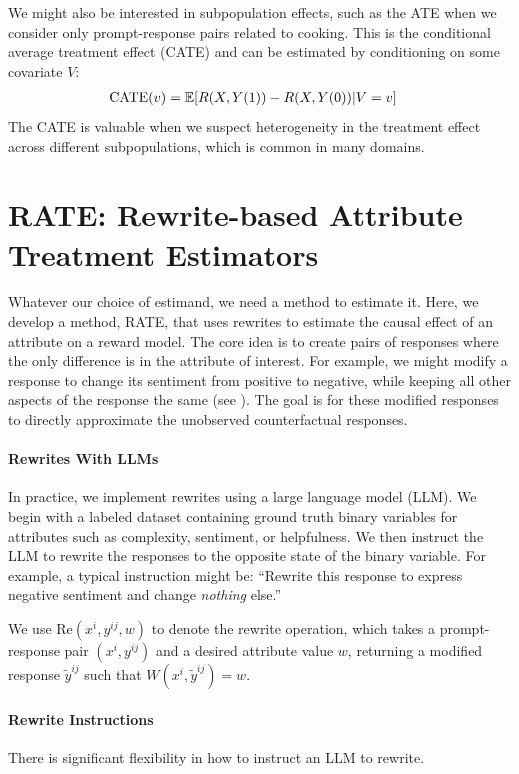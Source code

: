 \documentclass{article}
\begin{document}
We might also be interested in subpopulation effects, such as the ATE when we consider only prompt-response pairs related to cooking. This is the conditional average treatment effect (CATE) and can be estimated by conditioning on some covariate $V$:
\begin{align*}
  \text{CATE}(v) &= \mathbb{E}[R(X, Y(1)) - R(X, Y(0))|V=v]
\end{align*}
The CATE is valuable when we suspect heterogeneity in the treatment effect across different subpopulations, which is common in many domains.
\section{RATE: Rewrite-based Attribute Treatment Estimators} 
\label{sec:rate}

Whatever our choice of estimand, we need a method to estimate it. Here, we develop a method, RATE, that uses rewrites to estimate the causal effect of an attribute on a reward model. The core idea is to create pairs of responses where the only difference is in the attribute of interest. For example, we might modify a response to change its sentiment from positive to negative, while keeping all other aspects of the response the same (see ). The goal is for these modified responses to directly approximate the unobserved counterfactual responses.

\paragraph{Rewrites With LLMs}

In practice, we implement rewrites using a large language model (LLM). We begin with a labeled dataset containing ground truth binary variables for attributes such as complexity, sentiment, or helpfulness. We then instruct the LLM to rewrite the responses to the opposite state of the binary variable. For example, a typical instruction might be: ``Rewrite this response to express negative sentiment and change \emph{nothing} else.''

We use $\text{Re}(x^i, y^{ij}, w)$ to denote the rewrite operation, which takes a prompt-response pair $(x^i, y^{ij})$ and a desired attribute value $w$, returning a modified response $\tilde{y}^{ij}$ such that $W(x^i, \tilde{y}^{ij}) = w$.

\paragraph{Rewrite Instructions}
There is significant flexibility in how to instruct an LLM to rewrite.
\end{document}
